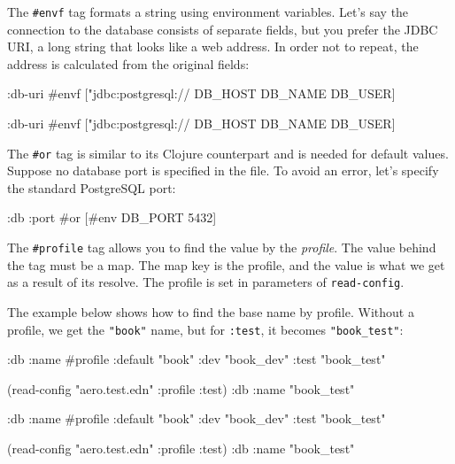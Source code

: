 The \verb|#envf| tag formats a string using environment variables. Let's say the connection to the database consists of separate fields, but you prefer the JDBC URI, a long string that looks like a web address. In order not to repeat, the address is calculated from the original fields:

\ifnarrow

\begin{clojure}
{:db-uri
 #envf ["jdbc:postgresql://%
        DB_HOST DB_NAME DB_USER]}
\end{clojure}

\else

\begin{clojure}
{:db-uri #envf ["jdbc:postgresql://%
                DB_HOST DB_NAME DB_USER]}
\end{clojure}

\fi

The \verb|#or| tag is similar to its Clojure counterpart and is needed for default values. Suppose no database port is specified in the file. To avoid an error, let's specify the standard PostgreSQL port:

\begin{clojure}
{:db {:port #or [#env DB_PORT 5432]}}
\end{clojure}


The \verb|#profile| tag allows you to find the value by the \emph{profile}. The value behind the tag must be a map. The map key is the profile, and the value is what we get as a result of its resolve. The profile is set in parameters of \verb|read-config|.

The example below shows how to find the base name by profile. Without a profile, we get the \verb|"book"| name, but for \verb|:test|, it becomes \verb|"book_test"|:

\ifnarrow

\begin{clojure}
{:db
 {:name
  #profile {:default "book"
            :dev     "book_dev"
            :test    "book_test"}}}

(read-config "aero.test.edn"
  {:profile :test})
{:db {:name "book_test"}}
\end{clojure}

\else

\begin{clojure}
{:db {:name #profile {:default "book"
                      :dev     "book_dev"
                      :test    "book_test"}}}

(read-config "aero.test.edn" {:profile :test})
{:db {:name "book_test"}}
\end{clojure}

